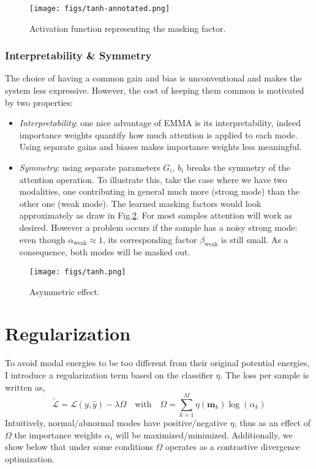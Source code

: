 \documentclass[12pt]{report}
\begin{document}
\begin{figure}[!hbtp]
\centering
\texttt{[image: figs/tanh-annotated.png]}
\caption{Activation function representing the masking factor.}
\label{fig:tanh}
\end{figure}

\subsubsection*{Interpretability \& Symmetry}
The choice of having a common gain and bias is unconventional and makes the system less expressive. However, the cost of keeping them common is motivated by two properties:
\begin{itemize}
\item \textit{Interpretability}: one nice advantage of EMMA is its interpretability, indeed importance weights quantify how much attention is applied to each mode. Using separate gains and biases makes importance weights less meaningful.
\item \textit{Symmetry}: using separate parameters $G_i$, $b_i$ breaks the symmetry of the attention operation. To illustrate this, take the case where we have two modalities, one contributing in general much more (strong mode) than the other one (weak mode). The learned masking factors would look approximately as draw in Fig.\ref{fig:mask-weak-strong}. For most samples attention will work as desired. However a problem occurs if the sample has a noisy strong mode: even though $\alpha_{\text{weak}} \approx 1$, its corresponding factor $\beta_{\text{weak}}$ is still small. As a consequence, both modes will be masked out. 
\end{itemize}

\begin{figure}[!htbp]
  \centering
  \texttt{[image: figs/tanh.png]}
  \caption{Asymmetric effect.}
  \label{fig:mask-weak-strong}
\end{figure}


\section{Regularization}\label{sec:regul}\label{sec:regul}

To avoid modal energies to be too different from their original potential energies, I introduce a regularization term based on the classifier $\eta$. The loss per sample is written as,
\begin{equation}
\tilde{\mathcal{L}} = \mathcal{L}(y,\hat{y}) - \lambda \Omega \quad \text{with} \quad \Omega = \sum_{k=1}^M \eta(\textbf{m}_k) \log(\alpha_k)
\label{eq:general}
\end{equation}
Intuitively, normal/abnormal modes have positive/negative $\eta$, thus as an effect of $\Omega$ the importance weights $\alpha_i$ will be maximized/minimized. Additionally, we show below that under some conditions $\Omega$ operates as a contrastive divergence optimization.\\[0.38cm]
\end{document}
